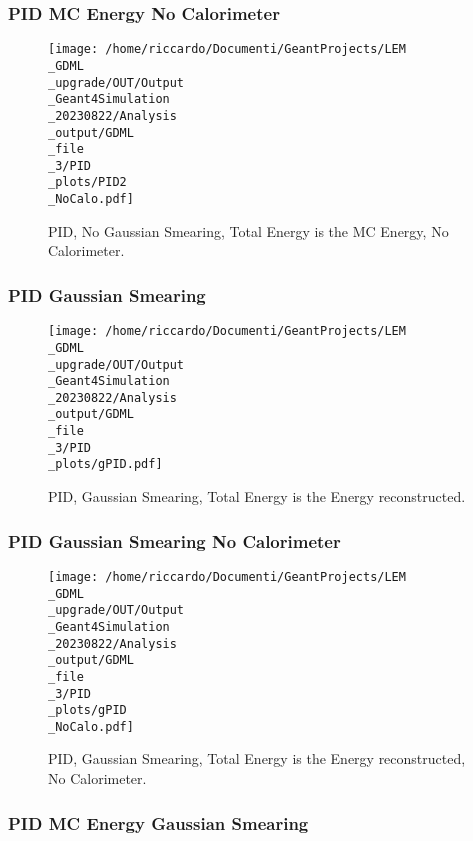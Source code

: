 \documentclass[8pt]{beamer}
\begin{document}
            \begin{frame}
                \frametitle{PID MC Energy No Calorimeter}
            
        \begin{figure}[h]
            \centering
            \texttt{[image: /home/riccardo/Documenti/GeantProjects/LEM\\\_GDML\\\_upgrade/OUT/Output\\\_Geant4Simulation\\\_20230822/Analysis\\\_output/GDML\\\_file\\\_3/PID\\\_plots/PID2\\\_NoCalo.pdf]}
            \caption{PID, No Gaussian Smearing, Total Energy is the MC Energy, No Calorimeter.}
        \end{figure}
        
            \end{frame}
            
            \begin{frame}
                \frametitle{PID Gaussian Smearing}
            
        \begin{figure}[h]
            \centering
            \texttt{[image: /home/riccardo/Documenti/GeantProjects/LEM\\\_GDML\\\_upgrade/OUT/Output\\\_Geant4Simulation\\\_20230822/Analysis\\\_output/GDML\\\_file\\\_3/PID\\\_plots/gPID.pdf]}
            \caption{PID, Gaussian Smearing, Total Energy is the Energy reconstructed.}
        \end{figure}
        
            \end{frame}
            
            \begin{frame}
                \frametitle{PID Gaussian Smearing No Calorimeter}
            
        \begin{figure}[h]
            \centering
            \texttt{[image: /home/riccardo/Documenti/GeantProjects/LEM\\\_GDML\\\_upgrade/OUT/Output\\\_Geant4Simulation\\\_20230822/Analysis\\\_output/GDML\\\_file\\\_3/PID\\\_plots/gPID\\\_NoCalo.pdf]}
            \caption{PID, Gaussian Smearing, Total Energy is the Energy reconstructed, No Calorimeter.}
        \end{figure}
        
            \end{frame}
            
            \begin{frame}
                \frametitle{PID MC Energy Gaussian Smearing}
            
            \end{frame}
            
\end{document}
